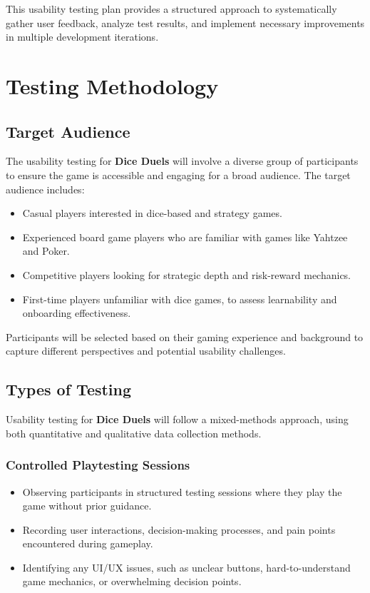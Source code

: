 \documentclass{article}
\begin{document}
This usability testing plan provides a structured approach to systematically gather user feedback, analyze test results, and implement necessary improvements in multiple development iterations.

\newpage

\section{Testing Methodology}

\subsection{Target Audience}
The usability testing for \textbf{Dice Duels} will involve a diverse group of participants to ensure the game is accessible and engaging for a broad audience. The target audience includes:
\begin{itemize}
    \item Casual players interested in dice-based and strategy games.
    \item Experienced board game players who are familiar with games like Yahtzee and Poker.
    \item Competitive players looking for strategic depth and risk-reward mechanics.
    \item First-time players unfamiliar with dice games, to assess learnability and onboarding effectiveness.
\end{itemize}
Participants will be selected based on their gaming experience and background to capture different perspectives and potential usability challenges.

\subsection{Types of Testing}
Usability testing for \textbf{Dice Duels} will follow a mixed-methods approach, using both quantitative and qualitative data collection methods.

\subsubsection{Controlled Playtesting Sessions}
\begin{itemize}
    \item Observing participants in structured testing sessions where they play the game without prior guidance.
    \item Recording user interactions, decision-making processes, and pain points encountered during gameplay.
    \item Identifying any UI/UX issues, such as unclear buttons, hard-to-understand game mechanics, or overwhelming decision points.
\end{itemize}
\end{document}
